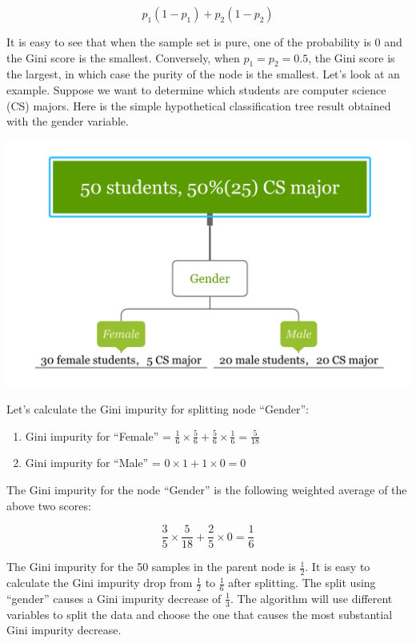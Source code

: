 \documentclass[
  12pt,
]{krantz}
\providecommand{\tightlist}{%
  \setlength{\itemsep}{0pt}\setlength{\parskip}{0pt}}
\begin{document}
\[p_{1}(1-p_{1})+p_{2}(1-p_{2})\]

It is easy to see that when the sample set is pure, one of the probability is 0 and the Gini score is the smallest. Conversely, when \(p_{1}=p_{2}=0.5\), the Gini score is the largest, in which case the purity of the node is the smallest. Let's look at an example. Suppose we want to determine which students are computer science (CS) majors. Here is the simple hypothetical classification tree result obtained with the gender variable.

\includegraphics{images/giniEN.PNG}

Let's calculate the Gini impurity for splitting node ``Gender'':

\begin{enumerate}
\def\labelenumi{\arabic{enumi}.}
\tightlist
\item
  Gini impurity for ``Female'' = \(\frac{1}{6}\times\frac{5}{6}+\frac{5}{6}\times\frac{1}{6}=\frac{5}{18}\)
\item
  Gini impurity for ``Male'' = \(0\times1+1\times 0=0\)
\end{enumerate}

The Gini impurity for the node ``Gender'' is the following weighted average of the above two scores:

\[\frac{3}{5}\times\frac{5}{18}+\frac{2}{5}\times 0=\frac{1}{6}\]

The Gini impurity for the 50 samples in the parent node is \(\frac{1}{2}\). It is easy to calculate the Gini impurity drop from \(\frac{1}{2}\) to \(\frac{1}{6}\) after splitting. The split using ``gender'' causes a Gini impurity decrease of \(\frac{1}{3}\). The algorithm will use different variables to split the data and choose the one that causes the most substantial Gini impurity decrease.
\end{document}

